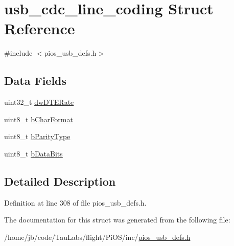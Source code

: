 \hypertarget{structusb__cdc__line__coding}{\section{usb\-\_\-cdc\-\_\-line\-\_\-coding \-Struct \-Reference}
\label{structusb__cdc__line__coding}
}


{\ttfamily \#include $<$pios\-\_\-usb\-\_\-defs.\-h$>$}

\subsection*{\-Data \-Fields}
\begin{DoxyCompactItemize}
\item 
uint32\-\_\-t \hyperlink{group___p_i_o_s___u_s_b___d_e_f_s_gabba439cd113503e9223c9d61865319d2}{dw\-D\-T\-E\-Rate}
\item 
uint8\-\_\-t \hyperlink{group___p_i_o_s___u_s_b___d_e_f_s_gaae309443995f9fe84f44a78bd866cc1a}{b\-Char\-Format}
\item 
uint8\-\_\-t \hyperlink{group___p_i_o_s___u_s_b___d_e_f_s_gad1b91d6baa7411fa9f6341140f5ac216}{b\-Parity\-Type}
\item 
uint8\-\_\-t \hyperlink{group___p_i_o_s___u_s_b___d_e_f_s_ga81e0e896a0524b8db945e1a8b50668e6}{b\-Data\-Bits}
\end{DoxyCompactItemize}


\subsection{\-Detailed \-Description}


\-Definition at line 308 of file pios\-\_\-usb\-\_\-defs.\-h.



\-The documentation for this struct was generated from the following file\-:\begin{DoxyCompactItemize}
\item 
/home/jb/code/\-Tau\-Labs/flight/\-Pi\-O\-S/inc/\hyperlink{pios__usb__defs_8h}{pios\-\_\-usb\-\_\-defs.\-h}\end{DoxyCompactItemize}

